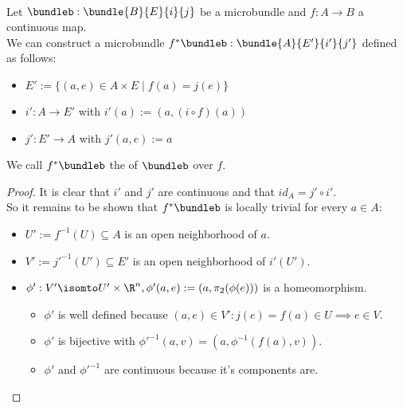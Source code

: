 \\ Let $\bundleb: \bundle{B}{E}{i}{j}$ be a microbundle and $f: A \to B$ a continuous map.
\\ We can construct a microbundle $f^*\bundleb: \bundle{A}{E'}{i'}{j'}$ defined as follows:
\begin{itemize}
    \item $E' := \{ (a, e) \in A \times E \mid f(a) = j(e) \}$
    \item $i': A \to E'$ with $i'(a) := (a, (i \circ f)(a))$
    \item $j': E' \to A$ with $j'(a, e) := a$
\end{itemize}
We call $f^*\bundleb$ the  of $\bundleb$ over $f$.
\begin{proof}
It is clear that $i'$ and $j'$ are continuous and that $id_A = j' \circ i'$.
\\ So it remains to be shown that $f^*\bundleb$ is locally trivial for every $a \in A$:
\begin{itemize}
    \item $U' := f^{-1}(U) \subseteq A$ is an open neighborhood of $a$.
    \item $V' := j'^{-1}(U') \subseteq E'$ is an open neighborhood of $i'(U')$.
    \item $\phi': V' \isomto U' \times \R^n, \phi'(a, e) := (a, \pi_2(\phi(e)))$ is a homeomorphism.
    \begin{itemize}
        \item $\phi'$ is well defined because $(a, e) \in V': j(e) = f(a) \in U \implies e \in V$.
        \item $\phi'$ is bijective with $\phi'^{-1}(a, v) = (a, \phi^{-1}(f(a), v))$.
        \item $\phi'$ and $\phi'^{-1}$ are continuous because it's components are.
    \end{itemize}
\end{itemize}
\end{proof}